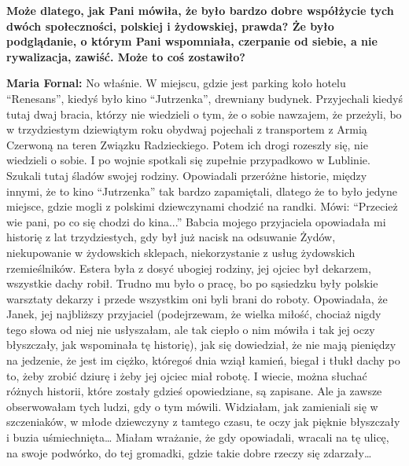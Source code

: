 \begin{otherlanguage}{polish}
\textbf{Może dlatego, jak Pani mówiła, że było bardzo dobre współżycie tych dwóch społeczności, polskiej i żydowskiej, prawda? Że było podglądanie, o którym Pani wspomniała, czerpanie od siebie, a nie rywalizacja, zawiść. Może to coś zostawiło?}

\textbf{Maria Fornal:} No właśnie. W miejscu, gdzie jest parking koło hotelu "`Renesans"', kiedyś było kino "`Jutrzenka"', drewniany budynek. Przyjechali kiedyś tutaj dwaj bracia, którzy nie wiedzieli o tym, że o sobie nawzajem, że przeżyli, bo w trzydziestym dziewiątym roku obydwaj pojechali z transportem z Armią Czerwoną na teren Związku Radzieckiego. Potem ich drogi rozeszły się, nie wiedzieli o sobie. I po wojnie spotkali się zupełnie przypadkowo w Lublinie. Szukali tutaj śladów swojej rodziny. Opowiadali przeróżne historie, między innymi, że to kino "`Jutrzenka"' tak bardzo zapamiętali, dlatego że to było jedyne miejsce, gdzie mogli z polskimi dziewczynami chodzić na randki. Mówi: "`Przecież wie pani, po co się chodzi do kina..."' Babcia mojego przyjaciela opowiadała mi historię z lat trzydziestych, gdy był już nacisk na odsuwanie Żydów, niekupowanie w żydowskich sklepach, niekorzystanie z usług żydowskich rzemieślników. Estera była z dosyć ubogiej rodziny, jej ojciec był dekarzem, wszystkie dachy robił. Trudno mu było o pracę, bo po sąsiedzku były polskie warsztaty dekarzy i przede wszystkim oni byli brani do roboty. Opowiadała, że Janek, jej najbliższy przyjaciel (podejrzewam, że wielka miłość, chociaż nigdy tego słowa od niej nie usłyszałam, ale tak ciepło o nim mówiła i tak jej oczy błyszczały, jak wspominała tę historię), jak się dowiedział, że nie mają pieniędzy na jedzenie, że jest im ciężko, któregoś dnia wziął kamień, biegał i tłukł dachy po to, żeby zrobić dziurę i żeby jej ojciec miał robotę. I wiecie, można słuchać różnych historii, które zostały gdzieś opowiedziane, są zapisane. Ale ja zawsze obserwowałam tych ludzi, gdy o tym mówili. Widziałam, jak zamieniali się w szczeniaków, w młode dziewczyny z tamtego czasu, te oczy jak pięknie błyszczały i buzia uśmiechnięta… Miałam wrażanie, że gdy opowiadali, wracali na tę ulicę, na swoje podwórko, do tej gromadki, gdzie takie dobre rzeczy się zdarzały… 
\end{otherlanguage}